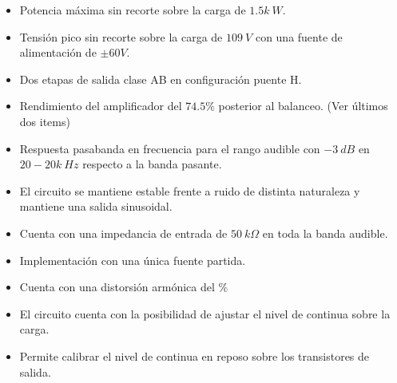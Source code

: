 \begin{itemize}
\item Potencia máxima sin recorte sobre la carga de $1.5k \ W$.
\item Tensión pico sin recorte sobre la carga de $109 \ V$ con una fuente de alimentación de $\pm 60V$.
\item Dos etapas de salida clase AB en configuración puente H.
\item Rendimiento del amplificador del $74.5\%$ posterior al balanceo. (Ver últimos dos items)
\item Respuesta pasabanda en frecuencia para el rango audible con $-3 \ dB$ en $20-20k \ Hz$ respecto a la banda pasante.
\item El circuito se mantiene estable frente a ruido de distinta naturaleza y mantiene una salida sinusoidal.
\item Cuenta con una impedancia de entrada de $50 \ k\Omega$ en toda la banda audible.
\item Implementación con una única fuente partida.
\item Cuenta con una distorsión armónica del $\%$
\item El circuito cuenta con la posibilidad de ajustar el nivel de continua sobre la carga.
\item Permite calibrar el nivel de continua en reposo sobre los transistores de salida.

\end{itemize}

